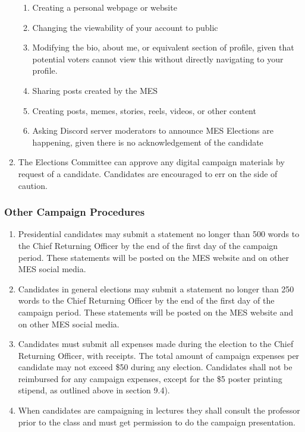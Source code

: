 \begin{enumerate}
  \begin{enumerate}
   \item
    Creating a personal webpage or website
   \item
    Changing the viewability of your account to public
   \item
    Modifying the bio, about me, or equivalent section of profile, given
    that potential voters cannot view this without directly navigating
    to your profile.
   \item
    Sharing posts created by the MES
   \item
    Creating posts, memes, stories, reels, videos, or other content
   \item
    Asking Discord server moderators to announce MES Elections are
    happening, given there is no acknowledgement of the candidate
  \end{enumerate}
 \item
  The Elections Committee can approve any digital campaign materials by
  request of a candidate. Candidates are encouraged to err on the side
  of caution.

\end{enumerate}

\hypertarget{other-campaign-procedures}{%
 \subsubsection{Other Campaign Procedures}
 \label{other-campaign-procedures}}
\begin{enumerate}
 \item
  Presidential candidates may submit a statement no longer than 500
  words to the Chief Returning Officer by the end of the first day of
  the campaign period. These statements will be posted on the MES
  website and on other MES social media.
 \item
  Candidates in general elections may submit a statement no longer than
  250 words to the Chief Returning Officer by the end of the first day
  of the campaign period. These statements will be posted on the MES
  website and on other MES social media.
 \item
  Candidates must submit all expenses made during the election to the
  Chief Returning Officer, with receipts. The total amount of campaign
  expenses per candidate may not exceed \$50 during any election.
  Candidates shall not be reimbursed for any campaign expenses, except
  for the \$5 poster printing stipend, as outlined above in section
  9.4).
 \item
  When candidates are campaigning in lectures they shall consult the
  professor prior to the class and must get permission to do the
  campaign presentation.

\end{enumerate}

